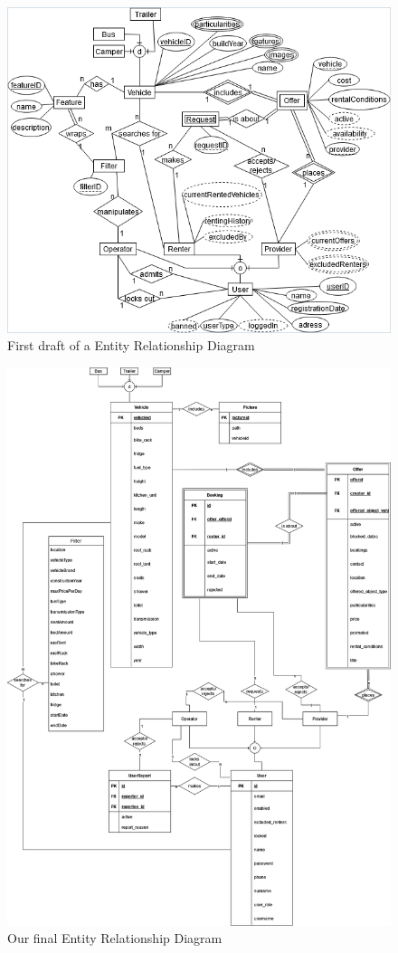 \begin{figure}[h]
	\centering
	\includegraphics[width=12cm]{resources/images/ER-diagram_first.png}
	\caption{First draft of a Entity Relationship Diagram}
	\label{fig:er-diagram_draft}
\end{figure}

\begin{figure}[h]
	\centering
	\includegraphics[width=15cm]{resources/images/ER-diagram_final.png}
	\caption{Our final Entity Relationship Diagram}
	\label{fig:er-diagram}
\end{figure}